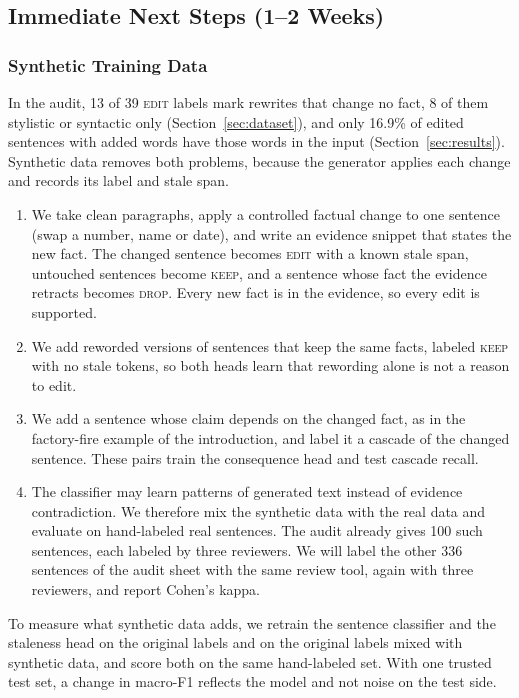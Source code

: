 \documentclass[11pt]{article}
\newcommand{\keep}{\textsc{keep}}
\newcommand{\edit}{\textsc{edit}}
\newcommand{\drop}{\textsc{drop}}
\begin{document}
    \subsection{Immediate Next Steps (1--2 Weeks)}
    \subsubsection{Synthetic Training Data}
    In the audit, 13 of 39 \edit{} labels mark rewrites that change no fact, 8 of them stylistic or syntactic only (Section~\ref{sec:dataset}), and only 16.9\% of edited sentences with added words have those words in the input (Section~\ref{sec:results}). Synthetic data removes both problems, because the generator applies each change and records its label and stale span.

    \begin{enumerate}
        \item We take clean paragraphs, apply a controlled factual change to one sentence (swap a number, name or date), and write an evidence snippet that states the new fact. The changed sentence becomes \edit{} with a known stale span, untouched sentences become \keep{}, and a sentence whose fact the evidence retracts becomes \drop{}. Every new fact is in the evidence, so every edit is supported.

        \item We add reworded versions of sentences that keep the same facts, labeled \keep{} with no stale tokens, so both heads learn that rewording alone is not a reason to edit.

        \item We add a sentence whose claim depends on the changed fact, as in the factory-fire example of the introduction, and label it a cascade of the changed sentence. These pairs train the consequence head and test cascade recall.

        \item The classifier may learn patterns of generated text instead of evidence contradiction. We therefore mix the synthetic data with the real data and evaluate on hand-labeled real sentences. The audit already gives 100 such sentences, each labeled by three reviewers. We will label the other 336 sentences of the audit sheet with the same review tool, again with three reviewers, and report Cohen's kappa.
    \end{enumerate}

    To measure what synthetic data adds, we retrain the sentence classifier and the staleness head on the original labels and on the original labels mixed with synthetic data, and score both on the same hand-labeled set. With one trusted test set, a change in macro-F1 reflects the model and not noise on the test side.
\end{document}
